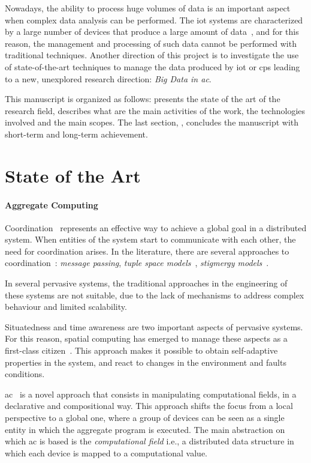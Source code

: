 \documentclass[12pt]{article}
\begin{document}
Nowadays,
the ability to process huge volumes of data is an important aspect when complex data analysis can be performed.
%
The \ac{iot} systems are characterized by a large number of devices that produce a large amount of data~\cite{GE2018601,9631963},
and for this reason,
the management and processing of such data cannot be performed with traditional techniques.
%
Another direction of this project is to investigate the use of state-of-the-art techniques to manage the data produced by \ac{iot} or \ac{cps}
leading to a new, unexplored research direction: \emph{Big Data in \ac{ac}}.

This manuscript is organized as follows:
 presents the state of the art of the research field,
 describes what are the main activities of the work,
the technologies involved and the main scopes.
%
The last section, , concludes the manuscript with short-term and long-term achievement.


\section{State of the Art}\label{sec:state-of-the-art}

\paragraph{Aggregate Computing}
Coordination~\cite{coordination} represents an effective way to achieve a global goal in a distributed system.
%
When entities of the system start to communicate with each other,
the need for coordination arises.
%
In the literature,
there are several approaches to coordination~\cite{ciancarini1996coordination}:
\emph{message passing}, \emph{tuple space models}~\cite{rossi2001tuple}, \emph{stigmergy models}~\cite{HEYLIGHEN20164}.

In several pervasive systems,
the traditional approaches in the engineering of these systems are not suitable,
due to the lack of mechanisms to address complex behaviour and limited scalability.

Situatedness and time awareness are two important aspects of pervasive systems.
%
For this reason,
spatial computing has emerged to manage these aspects as a first-class citizen~\cite{Beal_Viroli_2015}.
%
This approach makes it possible to obtain self-adaptive properties in the system,
and react to changes in the environment and faults conditions.

\ac{ac}~\cite{best-paper-aggregate} is a novel approach that consists in manipulating computational fields,
in a declarative and compositional way.
%
This approach shifts the focus from a local perspective to a global one,
where a group of devices can be seen as a single entity in which the aggregate program is executed.
%
The main abstraction on which \ac{ac} is based is the \emph{computational field} i.e.,
a distributed data structure in which each device is mapped to a computational value.
\end{document}
